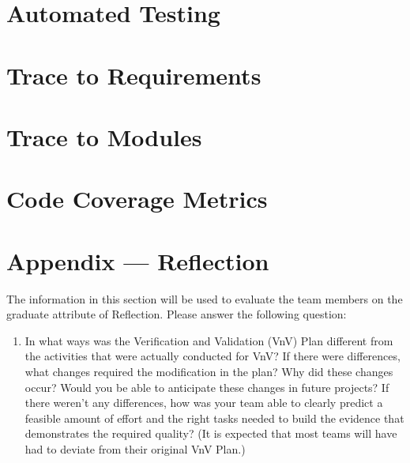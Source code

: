 \documentclass[12pt, titlepage]{article}
\begin{document}

\section{Automated Testing}
		
\section{Trace to Requirements}
		
\section{Trace to Modules}		

\section{Code Coverage Metrics}




\newpage{}
\section*{Appendix --- Reflection}

The information in this section will be used to evaluate the team members on the
graduate attribute of Reflection.  Please answer the following question:

\begin{enumerate}
  \item In what ways was the Verification and Validation (VnV) Plan different
  from the activities that were actually conducted for VnV?  If there were
  differences, what changes required the modification in the plan?  Why did
  these changes occur?  Would you be able to anticipate these changes in future
  projects?  If there weren't any differences, how was your team able to clearly
  predict a feasible amount of effort and the right tasks needed to build the
  evidence that demonstrates the required quality?  (It is expected that most
  teams will have had to deviate from their original VnV Plan.)
\end{enumerate}
\end{document}
